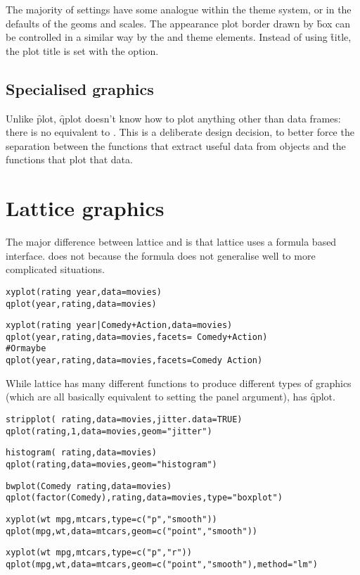 The majority of  settings have some analogue within the theme system, or in the defaults of the geoms and scales.  The appearance plot border drawn by \f{box} can be controlled in a similar way by the  and  theme elements.  Instead of using \f{title}, the plot title is set with the  option.

\subsection{Specialised graphics} 

Unlike \f{plot}, \f{qplot} doesn't know how to plot anything other than data frames: there is no equivalent to .  This is a deliberate design decision, to better force the separation between the functions that extract useful data from objects and the functions that plot that data.

% 
% 

\section{Lattice graphics}
\label{sec:translate-lattice}

The major difference between lattice and \ggplot is that lattice uses a formula based interface.  \ggplot does not because the formula does not generalise well to more complicated situations.

\begin{alltt}
xyplot(rating ~ year, data=movies)
qplot(year, rating, data=movies)

xyplot(rating ~ year | Comedy + Action, data = movies)
qplot(year, rating, data = movies, facets = ~ Comedy + Action)
# Or maybe
qplot(year, rating, data = movies, facets = Comedy ~ Action)
\end{alltt}

While lattice has many different functions to produce different types of graphics (which are all basically equivalent to setting the panel argument), \ggplot has \f{qplot}.

\begin{alltt}
stripplot(~ rating, data = movies, jitter.data = TRUE)
qplot(rating, 1, data = movies, geom = "jitter")

histogram(~ rating, data = movies)
qplot(rating, data = movies, geom = "histogram")

bwplot(Comedy ~ rating ,data = movies)
qplot(factor(Comedy), rating, data = movies, type = "boxplot")

xyplot(wt ~ mpg, mtcars, type = c("p","smooth"))
qplot(mpg, wt, data = mtcars, geom = c("point","smooth"))

xyplot(wt ~ mpg, mtcars, type = c("p","r"))
qplot(mpg, wt, data = mtcars, geom = c("point","smooth"), method = "lm")
\end{alltt}

